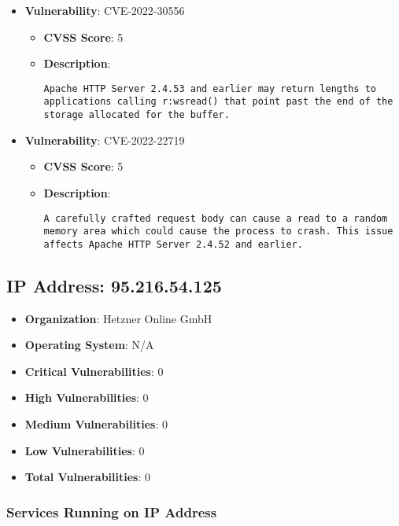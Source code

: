 \documentclass{article}
\begin{document}
\begin{itemize}
        \item \textbf{Vulnerability}: CVE-2022-30556
        \begin{itemize}
            \item \textbf{CVSS Score}:  5 
            \item \textbf{Description}:
            \parbox[t]{0.9\linewidth}{
                \verb|Apache HTTP Server 2.4.53 and earlier may return lengths to applications calling r:wsread() that point past the end of the storage allocated for the buffer.|
            }
        \end{itemize}
    
        \item \textbf{Vulnerability}: CVE-2022-22719
        \begin{itemize}
            \item \textbf{CVSS Score}:  5 
            \item \textbf{Description}:
            \parbox[t]{0.9\linewidth}{
                \verb|A carefully crafted request body can cause a read to a random memory area which could cause the process to crash. This issue affects Apache HTTP Server 2.4.52 and earlier.|
            }
        \end{itemize}
    
\end{itemize}




\clearpage



\subsection*{IP Address: 95.216.54.125}

\begin{itemize}
    \item \textbf{Organization}: Hetzner Online GmbH
    \item \textbf{Operating System}:  N/A 
    \item \textbf{Critical Vulnerabilities}: 0
    \item \textbf{High Vulnerabilities}: 0
    \item \textbf{Medium Vulnerabilities}: 0
    \item \textbf{Low Vulnerabilities}: 0
    \item \textbf{Total Vulnerabilities}: 0
\end{itemize}

\subsubsection*{Services Running on IP Address}
\end{document}
